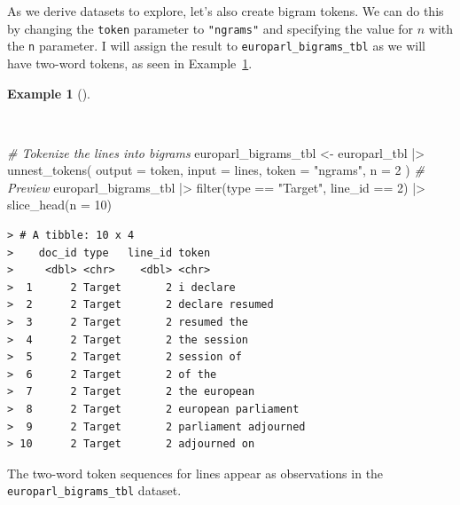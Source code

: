 \documentclass[
  letterpaper,
  DIV=11,
  numbers=noendperiod]{scrreprt}
\newenvironment{Shaded}{\begin{snugshade}}{\end{snugshade}}
\newcommand{\AttributeTok}[1]{\textcolor[rgb]{0.00,0.00,0.00}{#1}}
\newcommand{\CommentTok}[1]{\textcolor[rgb]{0.00,0.00,0.00}{\textit{#1}}}
\newcommand{\DecValTok}[1]{\textcolor[rgb]{0.00,0.00,0.00}{#1}}
\newcommand{\FunctionTok}[1]{\textcolor[rgb]{0.00,0.00,0.00}{#1}}
\newcommand{\NormalTok}[1]{\textcolor[rgb]{0.00,0.00,0.00}{#1}}
\newcommand{\OtherTok}[1]{\textcolor[rgb]{0.00,0.00,0.00}{#1}}
\newcommand{\SpecialCharTok}[1]{\textcolor[rgb]{0.00,0.00,0.00}{#1}}
\newcommand{\StringTok}[1]{\textcolor[rgb]{0.00,0.00,0.00}{#1}}
\theoremstyle{definition}
\newtheorem{example}{Example}[chapter]
\theoremstyle{remark}
\begin{document}
As we derive datasets to explore, let's also create bigram tokens. We
can do this by changing the \texttt{token} parameter to
\texttt{"ngrams"} and specifying the value for \(n\) with the \texttt{n}
parameter. I will assign the result to \texttt{europarl\_bigrams\_tbl}
as we will have two-word tokens, as seen in
Example~\ref{exm-td-europarl-tokenization-bigrams-tidytext}.

\begin{example}[]\protect\hypertarget{exm-td-europarl-tokenization-bigrams-tidytext}{}\label{exm-td-europarl-tokenization-bigrams-tidytext}

~

\begin{Shaded}
\begin{Highlighting}[]
\CommentTok{\# Tokenize the lines into bigrams}
\NormalTok{europarl\_bigrams\_tbl }\OtherTok{\textless{}{-}}
\NormalTok{  europarl\_tbl }\SpecialCharTok{|\textgreater{}}
  \FunctionTok{unnest\_tokens}\NormalTok{(}
    \AttributeTok{output =}\NormalTok{ token,}
    \AttributeTok{input =}\NormalTok{ lines,}
    \AttributeTok{token =} \StringTok{"ngrams"}\NormalTok{,}
    \AttributeTok{n =} \DecValTok{2}
\NormalTok{  )}
\CommentTok{\# Preview}
\NormalTok{europarl\_bigrams\_tbl }\SpecialCharTok{|\textgreater{}}
  \FunctionTok{filter}\NormalTok{(type }\SpecialCharTok{==} \StringTok{"Target"}\NormalTok{, line\_id }\SpecialCharTok{==} \DecValTok{2}\NormalTok{) }\SpecialCharTok{|\textgreater{}}
  \FunctionTok{slice\_head}\NormalTok{(}\AttributeTok{n =} \DecValTok{10}\NormalTok{)}
\end{Highlighting}
\end{Shaded}

\begin{verbatim}
> # A tibble: 10 x 4
>    doc_id type   line_id token               
>     <dbl> <chr>    <dbl> <chr>               
>  1      2 Target       2 i declare           
>  2      2 Target       2 declare resumed     
>  3      2 Target       2 resumed the         
>  4      2 Target       2 the session         
>  5      2 Target       2 session of          
>  6      2 Target       2 of the              
>  7      2 Target       2 the european        
>  8      2 Target       2 european parliament 
>  9      2 Target       2 parliament adjourned
> 10      2 Target       2 adjourned on
\end{verbatim}

\end{example}

The two-word token sequences for lines appear as observations in the
\texttt{europarl\_bigrams\_tbl} dataset.
\end{document}
